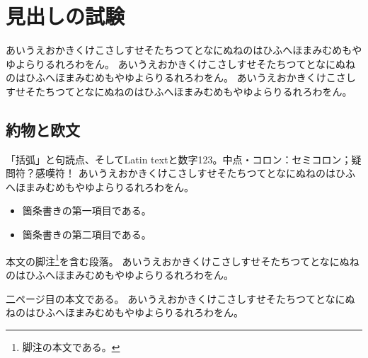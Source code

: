 %
%
\makeatletter
{}%
\makeatother

\section{見出しの試験}
あいうえおかきくけこさしすせそたちつてとなにぬねのはひふへほまみむめもやゆよらりるれろわをん。
あいうえおかきくけこさしすせそたちつてとなにぬねのはひふへほまみむめもやゆよらりるれろわをん。
あいうえおかきくけこさしすせそたちつてとなにぬねのはひふへほまみむめもやゆよらりるれろわをん。

\subsection{約物と欧文}
「括弧」と句読点、そしてLatin textと数字123。中点・コロン：セミコロン；疑問符？感嘆符！
あいうえおかきくけこさしすせそたちつてとなにぬねのはひふへほまみむめもやゆよらりるれろわをん。

\begin{itemize}
\item 箇条書きの第一項目である。
\item 箇条書きの第二項目である。
\end{itemize}

本文の脚注\footnote{脚注の本文である。}を含む段落。
あいうえおかきくけこさしすせそたちつてとなにぬねのはひふへほまみむめもやゆよらりるれろわをん。

\newpage
二ページ目の本文である。
あいうえおかきくけこさしすせそたちつてとなにぬねのはひふへほまみむめもやゆよらりるれろわをん。
